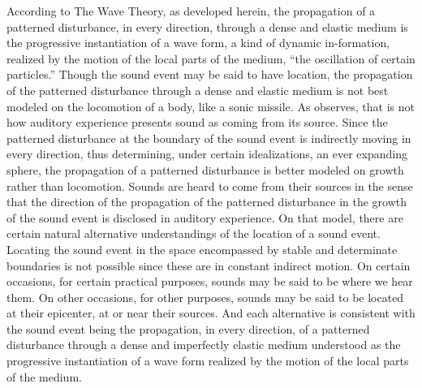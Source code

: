 According to The Wave Theory, as developed herein, the propagation of a patterned disturbance, in every direction, through a dense and elastic medium is the progressive instantiation of a wave form, a kind of dynamic in-formation, realized by the motion of the local parts of the medium, ``the oscillation of certain particles.'' Though the sound event may be said to have location, the propagation of the patterned disturbance through a dense and elastic medium is not best modeled on the locomotion of a body, like a sonic missile. As \citet{OCallaghan:2007xy,OCallaghan:2009aa} observes, that is not how auditory experience presents sound as coming from its source.  Since the patterned disturbance at the boundary of the sound event is indirectly moving in every direction, thus determining, under certain idealizations, an ever expanding sphere, the propagation of a patterned disturbance is better modeled on growth rather than locomotion. Sounds are heard to come from their sources in the sense that the direction of the propagation of the patterned disturbance in the growth of the sound event is disclosed in auditory experience. On that model, there are certain natural alternative understandings of the location of a sound event. Locating the sound event in the space encompassed by stable and determinate boundaries is not possible since these are in constant indirect motion. On certain occasions, for certain practical purposes, sounds may be said to be where we hear them. On other occasions, for other purposes, sounds may be said to be located at their epicenter, at or near their sources. And each alternative is consistent with the sound event being the propagation, in every direction, of a patterned disturbance through a dense and imperfectly elastic medium understood as the progressive instantiation of a wave form realized by the motion of the local parts of the medium. 

